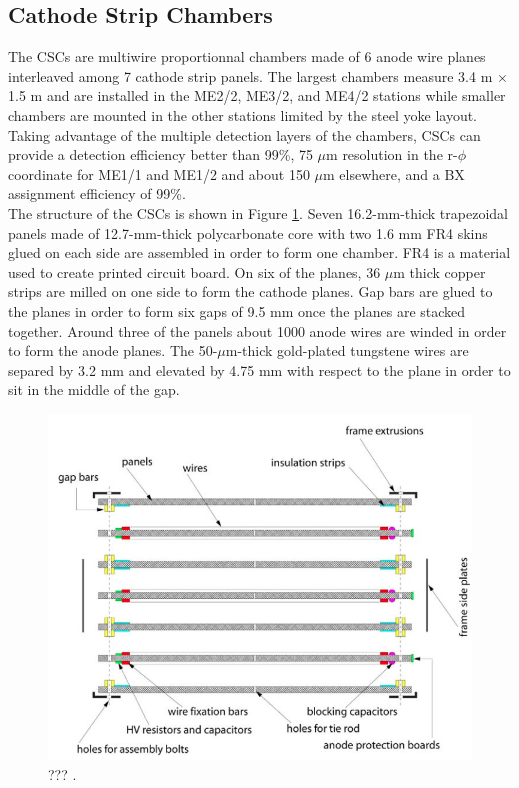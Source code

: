   	\subsection{Cathode Strip Chambers}

      The CSCs are multiwire proportionnal chambers made of 6 anode wire planes interleaved among 7 cathode strip panels. The largest chambers measure 3.4 m $ \times $ 1.5 m and are installed in the ME2/2, ME3/2, and ME4/2 stations while smaller chambers are mounted in the other stations limited by the steel yoke layout. Taking advantage of the multiple detection layers of the chambers, CSCs can provide a detection efficiency better than 99\%, 75 $\mu$m resolution in the r-$\phi$ coordinate for ME1/1 and ME1/2 and about 150 $\mu$m elsewhere, and a BX assignment efficiency of 99\%. \\

      The structure of the CSCs is shown in Figure \ref{fig:I-3-csc}. Seven 16.2-mm-thick trapezoidal panels made of 12.7-mm-thick polycarbonate core with two 1.6 mm FR4 skins glued on each side are assembled in order to form one chamber. FR4 is a material used to create printed circuit board. On six of the planes, 36 $\mu$m thick copper strips are milled on one side to form the cathode planes. Gap bars are glued to the planes in order to form six gaps of 9.5 mm once the planes are stacked together. Around three of the panels about 1000 anode wires are winded in order to form the anode planes. The 50-$\mu$m-thick gold-plated tungstene wires are separed by 3.2 mm and elevated by 4.75 mm with respect to the plane in order to sit in the middle of the gap.

      \begin{figure}[h!]
        \centering
        \includegraphics[width=\textwidth]{img/I-3-cms/csc.png}
        \caption{??? \cite{1748-0221-3-08-S08004}.}
        \label{fig:I-3-csc}
      \end{figure}

